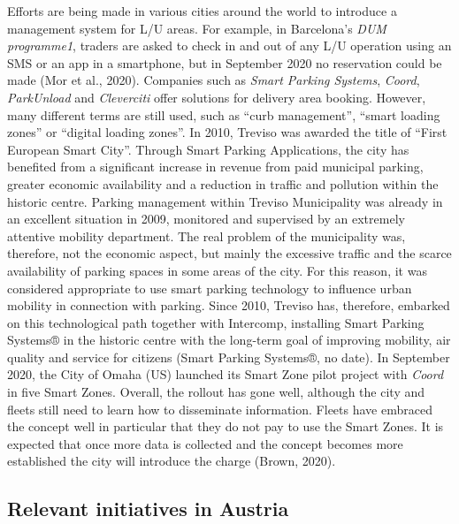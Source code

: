 \documentclass[
]{book}
\begin{document}
Efforts are being made in various cities around the world to introduce a management system for L/U areas. For example, in Barcelona's \emph{DUM programme1}, traders are asked to check in and out of any L/U operation using an SMS or an app in a smartphone, but in September 2020 no reservation could be made (Mor et al., 2020).
Companies such as \emph{Smart Parking Systems}, \emph{Coord}, \emph{ParkUnload} and \emph{Cleverciti} offer solutions for delivery area booking. However, many different terms are still used, such as ``curb management'', ``smart loading zones'' or ``digital loading zones''.
In 2010, Treviso was awarded the title of ``First European Smart City''. Through Smart Parking Applications, the city has benefited from a significant increase in revenue from paid municipal parking, greater economic availability and a reduction in traffic and pollution within the historic centre. Parking management within Treviso Municipality was already in an excellent situation in 2009, monitored and supervised by an extremely attentive mobility department.
The real problem of the municipality was, therefore, not the economic aspect, but mainly the excessive traffic and the scarce availability of parking spaces in some areas of the city. For this reason, it was considered appropriate to use smart parking technology to influence urban mobility in connection with parking. Since 2010, Treviso has, therefore, embarked on this technological path together with Intercomp, installing Smart Parking Systems® in the historic centre with the long-term goal of improving mobility, air quality and service for citizens (Smart Parking Systems®, no date).
In September 2020, the City of Omaha (US) launched its Smart Zone pilot project with \emph{Coord} in five Smart Zones. Overall, the rollout has gone well, although the city and fleets still need to learn how to disseminate information. Fleets have embraced the concept well in particular that they do not pay to use the Smart Zones. It is expected that once more data is collected and the concept becomes more established the city will introduce the charge (Brown, 2020).

\hypertarget{relevant-initiatives-in-austria-32}{%
\subsection*{Relevant initiatives in Austria}\label{relevant-initiatives-in-austria-32}}
\end{document}

